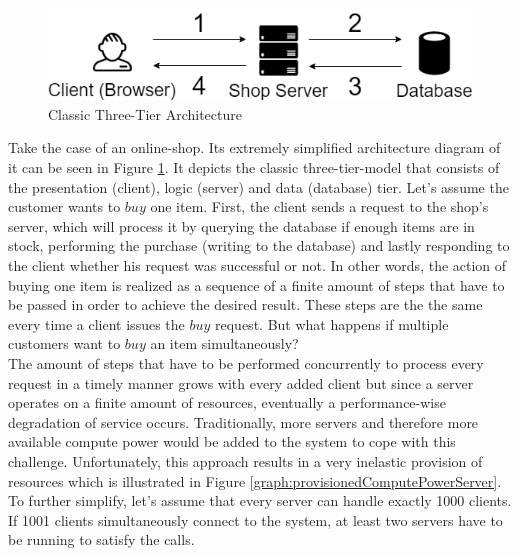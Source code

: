 \begin{figure}[ht]
    \includegraphics[width=0.9\linewidth]{images/drawio/3tier-oneclient.png}\centering
    \caption {Classic Three-Tier Architecture}
    \label{fig:3tier1client}
\end{figure}

Take the case of an online-shop. Its extremely simplified architecture diagram of it can be seen in Figure \ref{fig:3tier1client}. It depicts the classic three-tier-model that consists of the presentation (client), logic (server) and data (database) tier.\autocite{Ramirez2000Three-TierArchitecture} Let's assume the customer wants to $buy$ one item. First, the client sends a request to the shop's server, which will process it by querying the database if enough items are in stock, performing the purchase (writing to the database) and lastly responding to the client whether his request was successful or not. In other words, the action of buying one item is realized as a sequence of a finite amount of steps that have to be passed in order to achieve the desired result. These steps are the the same every time a client issues the $buy$ request. But what happens if multiple customers want to $buy$ an item simultaneously? \\
The amount of steps that have to be performed concurrently to process every request in a timely manner grows with every added client but since a server operates on a finite amount of resources, eventually a performance-wise degradation of service occurs. Traditionally, more servers and therefore more available compute power would be added to the system to cope with this challenge. Unfortunately, this approach results in a very inelastic provision of resources which is illustrated in Figure \ref{graph:provisionedComputePowerServer}. To further simplify, let's assume that every server can handle exactly 1000 clients. If 1001 clients simultaneously connect to the system, at least two servers have to be running to satisfy the calls. 

